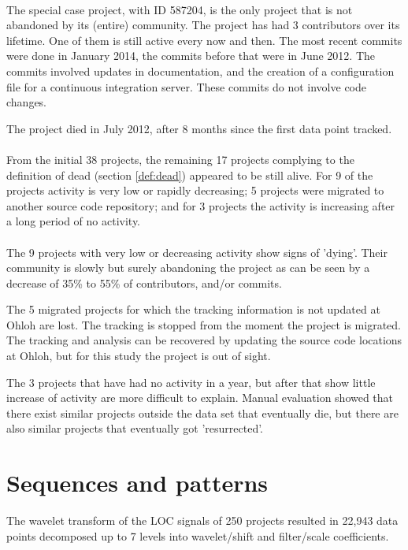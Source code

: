 \paragraph{}
The special case project, with ID 587204, is the only project that is not
abandoned by its (entire) community. The project has had 3 contributors over its
lifetime. One of them is still active every now and then. The most recent
commits were done in January 2014, the commits before that were in June 2012.
The commits involved updates in documentation, and the creation of a
configuration file for a continuous integration server. These commits do not
involve code changes.

The project died in July 2012, after 8 months since the first data point
tracked.

\paragraph{}
From the initial 38 projects, the remaining 17 projects complying to the
definition of dead (section \ref{def:dead}) appeared to be still alive. For 9
of the projects activity is very low or rapidly decreasing; 5 projects were
migrated to another source code repository; and for 3 projects the activity is
increasing after a long period of no activity.

\paragraph{}
The 9 projects with very low or decreasing activity show signs of 'dying'. Their
community is slowly but surely abandoning the project as can be seen by a
decrease of 35\% to 55\% of contributors, and/or commits.

The 5 migrated projects for which the tracking information is not updated at
Ohloh are lost. The tracking is stopped from the moment the project is
migrated. The tracking and analysis can be recovered by updating the source
code locations at Ohloh, but for this study the project is out of sight.

The 3 projects that have had no activity in a year, but after that show little
increase of activity are more difficult to explain. Manual evaluation showed
that there exist similar projects outside the data set that eventually die, but
there are also similar projects that eventually got 'resurrected'.



\section{Sequences and patterns}
The wavelet transform of the LOC signals of 250 projects resulted in 22,943
data points decomposed up to 7 levels into wavelet/shift and filter/scale
coefficients.

